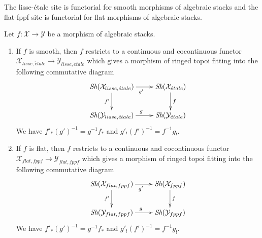 \noindent
The lisse-\'etale site is functorial for smooth morphisms of algebraic stacks
and the flat-fppf site is functorial for flat morphisms of algebraic stacks.

\begin{lemma}
\label{lemma-lisse-etale-functorial}
Let $f : \mathcal{X} \to \mathcal{Y}$ be a morphism of algebraic stacks.
\begin{enumerate}
\item If $f$ is smooth, then $f$ restricts to a continuous and cocontinuous
functor
$\mathcal{X}_{lisse,\acute{e}tale} \to \mathcal{Y}_{lisse,\acute{e}tale}$
which gives a morphism of ringed topoi fitting into the following
commutative diagram
$$
\xymatrix{
\Sh(\mathcal{X}_{lisse,\acute{e}tale}) \ar[r]_{g'} \ar[d]_{f'} &
\Sh(\mathcal{X}_{\acute{e}tale}) \ar[d]^f \\
\Sh(\mathcal{Y}_{lisse,\acute{e}tale}) \ar[r]^g &
\Sh(\mathcal{Y}_{\acute{e}tale})
}
$$
We have $f'_*(g')^{-1} = g^{-1}f_*$ and $g'_!(f')^{-1} = f^{-1}g_!$.
\item If $f$ is flat, then $f$ restricts to a continuous and cocontinuous
functor
$\mathcal{X}_{flat,fppf} \to \mathcal{Y}_{flat,fppf}$
which gives a morphism of ringed topoi fitting into the following
commutative diagram
$$
\xymatrix{
\Sh(\mathcal{X}_{flat,fppf}) \ar[r]_{g'} \ar[d]_{f'} &
\Sh(\mathcal{X}_{fppf}) \ar[d]^f \\
\Sh(\mathcal{Y}_{flat,fppf}) \ar[r]^g &
\Sh(\mathcal{Y}_{fppf})
}
$$
We have $f'_*(g')^{-1} = g^{-1}f_*$ and $g'_!(f')^{-1} = f^{-1}g_!$.
\end{enumerate}
\end{lemma}

